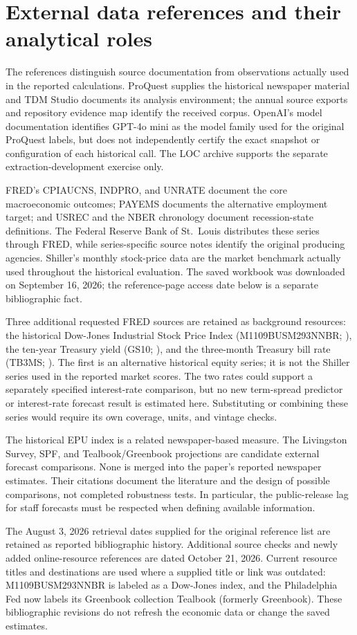 \section{External data references and their analytical roles}\label{app:external}
The references distinguish source documentation from observations actually used in the reported calculations. ProQuest supplies the historical newspaper material and TDM Studio documents its analysis environment; the annual source exports and repository evidence map identify the received corpus. OpenAI's model documentation identifies GPT-4o mini as the model family used for the original ProQuest labels, but does not independently certify the exact snapshot or configuration of each historical call. The LOC archive supports the separate extraction-development exercise only.

FRED's CPIAUCNS, INDPRO, and UNRATE document the core macroeconomic outcomes; PAYEMS documents the alternative employment target; and USREC and the NBER chronology document recession-state definitions. The Federal Reserve Bank of St.\ Louis distributes these series through FRED, while series-specific source notes identify the original producing agencies. Shiller's monthly stock-price data are the market benchmark actually used throughout the historical evaluation. The saved workbook was downloaded on September 16, 2026; the reference-page access date below is a separate bibliographic fact.

Three additional requested FRED sources are retained as background resources: the historical Dow-Jones Industrial Stock Price Index (M1109BUSM293NNBR; \citealp{fredstock}), the ten-year Treasury yield (GS10; \citealp{fredgs10}), and the three-month Treasury bill rate (TB3MS; \citealp{fredtb3ms}). The first is an alternative historical equity series; it is not the Shiller series used in the reported market scores. The two rates could support a separately specified interest-rate comparison, but no new term-spread predictor or interest-rate forecast result is estimated here. Substituting or combining these series would require its own coverage, units, and vintage checks.

The historical EPU index is a related newspaper-based measure. The Livingston Survey, SPF, and Tealbook/Greenbook projections are candidate external forecast comparisons. None is merged into the paper's reported newspaper estimates. Their citations document the literature and the design of possible comparisons, not completed robustness tests. In particular, the public-release lag for staff forecasts must be respected when defining available information.

The August 3, 2026 retrieval dates supplied for the original reference list are retained as reported bibliographic history. Additional source checks and newly added online-resource references are dated October 21, 2026. Current resource titles and destinations are used where a supplied title or link was outdated: M1109BUSM293NNBR is labeled as a Dow-Jones index, and the Philadelphia Fed now labels its Greenbook collection Tealbook (formerly Greenbook). These bibliographic revisions do not refresh the economic data or change the saved estimates.

